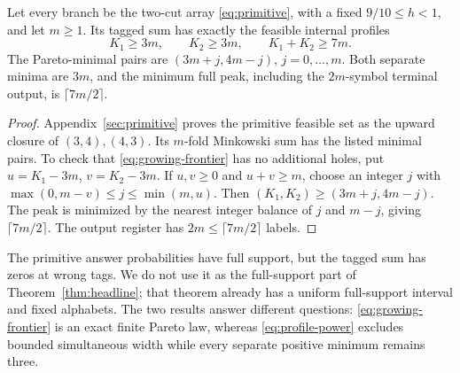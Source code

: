 \begin{corollary}
\label{cor:pareto-sum}
Let every branch be the two-cut array \eqref{eq:primitive}, with a fixed
$9/10\le h<1$, and let $m\ge1$. Its tagged sum has exactly the feasible
internal profiles
\begin{equation}\label{eq:growing-frontier}
              K_1\ge3m,\qquad K_2\ge3m,\qquad K_1+K_2\ge7m.
\end{equation}
The Pareto-minimal pairs are $(3m+j,4m-j)$, $j=0,\ldots,m$.
Both separate minima are $3m$, and the minimum full peak, including the
$2m$-symbol terminal output, is $\lceil7m/2\rceil$.
\end{corollary}
\begin{proof}
Appendix~\ref{sec:primitive} proves the primitive feasible set as the
upward closure of $(3,4),(4,3)$. Its $m$-fold Minkowski sum has the
listed minimal pairs. To check that \eqref{eq:growing-frontier} has no
additional holes, put $u=K_1-3m$, $v=K_2-3m$. If $u,v\ge0$ and
$u+v\ge m$, choose an integer $j$ with
$\max(0,m-v)\le j\le\min(m,u)$. Then
$(K_1,K_2)\ge(3m+j,4m-j)$. The peak is minimized by the nearest
integer balance of $j$ and $m-j$, giving $\lceil7m/2\rceil$.
The output register has $2m\le\lceil7m/2\rceil$ labels.
\end{proof}

The primitive answer probabilities have full support, but the tagged
sum has zeros at wrong tags. We do not use it as the full-support part
of Theorem~\ref{thm:headline}; that theorem already has a uniform
full-support interval and fixed alphabets. The two results answer
different questions: \eqref{eq:growing-frontier} is an exact finite
Pareto law, whereas \eqref{eq:profile-power} excludes bounded
simultaneous width while every separate positive minimum remains three.
